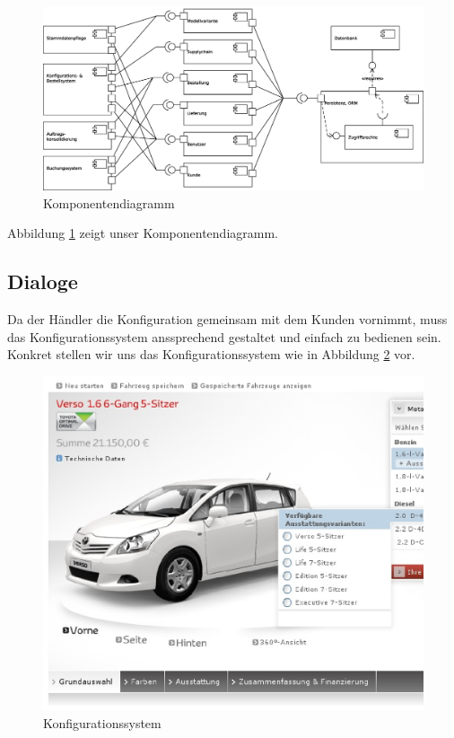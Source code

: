 \documentclass[a4paper,10pt,left=4.5cm,right=3cm,top=1cm,bottom=2cm]{article}
\begin{document}
\begin{figure}[htb]
 \begin{center}
   \includegraphics[width=1\textwidth]{komponentenDiagramm}
    \caption{Komponentendiagramm}
    \label{komponentendiagramm}
  \end{center}
\end{figure}

Abbildung \ref{komponentendiagramm} zeigt unser Komponentendiagramm.


\subsection{Dialoge}

Da der Händler die Konfiguration gemeinsam mit dem Kunden vornimmt, muss das Konfigurationssystem anssprechend gestaltet und einfach zu bedienen sein.
Konkret stellen wir uns das Konfigurationssystem wie in Abbildung \ref{konfigurator} vor.

\begin{figure}[htb]
 \begin{center}
\hspace*{-7cm}
   \includegraphics[width=1\textwidth]{dialog_config}
    \caption{Konfigurationssystem}
    \label{konfigurator}
  \end{center}
\end{figure}
\end{document}
